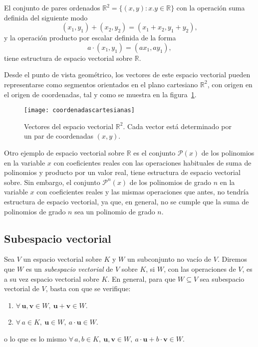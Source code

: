 \documentclass[a4paper]{article}
\begin{document}
\begin{ejemplo}
El conjunto de pares ordenados $\mathbb{R}^2=\{(x,y):x.y\in \mathbb{R}\}$ con
la operación suma definida del siguiente modo
\[
(x_1,y_1)+(x_2,y_2)=(x_1+x_2,y_1+y_2),
\]
y la operación producto por escalar definida de la forma
\[
a\cdot(x_1,y_1)=(ax_1,ay_1),
\]
tiene estructura de espacio vectorial sobre $\mathbb{R}$.

Desde el punto de vista geométrico, los vectores de este espacio vectorial
pueden representarse como segmentos orientados en el plano cartesiano
$\mathbb{R}^2$, con origen en el origen de coordenadas, tal y como se muestra en la figura~\ref{g:coordenadascartesianas}. 

\begin{figure}[h!]
\begin{center}
\texttt{[image: coordenadascartesianas]}
\caption{Vectores del espacio vectorial $\mathbb{R}^2$. Cada vector está determinado por un par de coordenadas $(x,y)$.}
\label{g:coordenadascartesianas}
\end{center}
\end{figure}

Otro ejemplo de espacio vectorial sobre $\mathbb{R}$ es el conjunto
$\mathcal{P}(x)$ de los polinomios en la variable $x$ con coeficientes reales
con las operaciones habituales de suma de polinomios y producto por un valor
real, tiene estructura de espacio vectorial sobre. Sin embargo, el conjunto
$\mathcal{P}^n(x)$ de los polinomios de grado $n$ en la variable $x$ con
coeficientes reales y las mismas operaciones que antes, no tendría estructura
de espacio vectorial, ya que, en general, no se cumple que la suma de
polinomios de grado $n$ sea un polinomio de grado $n$.
\end{ejemplo}

\subsection*{Subespacio vectorial}
Sea $V$ un espacio vectorial sobre $K$ y $W$ un subconjunto no vacío de $V$. Diremos que $W$ es un \emph{subespacio vectorial} de $V$ sobre $K$, si $W$, con las operaciones de $V$, es a su vez espacio vectorial sobre $K$.
En general, para que $W\subseteq V$ sea subespacio vectorial de $V$, basta con que se verifique:
\begin{enumerate}
\item $\forall\, \mathbf{u},\mathbf{v}\in W,\  \mathbf{u}+\mathbf{v}\in W$.
\item $\forall\, a\in K,\ \mathbf{u}\in W,\ a\cdot \mathbf{u}\in W$.
\end{enumerate}
o lo que es lo mismo $\forall\, a,b\in K,\ \mathbf{u},\mathbf{v}\in W,\  a\cdot \mathbf{u}+b\cdot \mathbf{v}\in W$.
\end{document}
